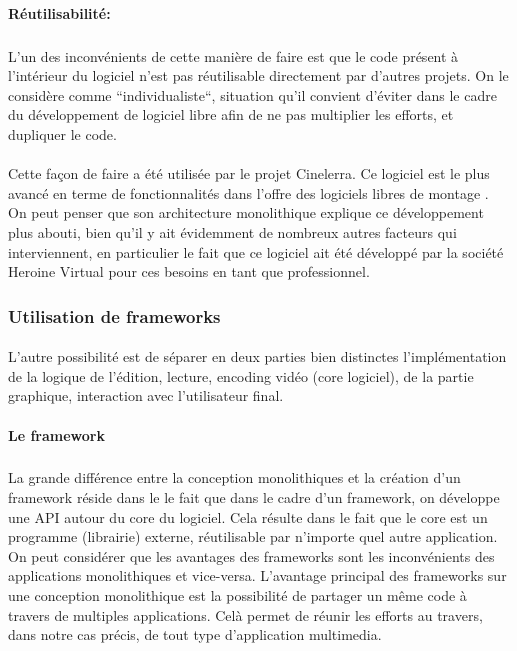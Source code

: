 \paragraph{Réutilisabilité:}

\subparagraph { }

L'un des inconvénients de cette manière de faire est que le code
présent
 à l'intérieur du logiciel n'est pas réutilisable directement
par d'autres projets. On le considère comme ``individualiste``, situation
qu'il convient d'éviter dans le cadre du développement de logiciel
libre afin de ne pas multiplier les efforts, et dupliquer le code.

\paragraph{}

Cette façon de faire a été utilisée par le projet Cinelerra. Ce
logiciel est le plus avancé en terme de fonctionnalités dans l'offre
des logiciels libres de montage . On peut penser que son architecture
monolithique explique ce développement plus
abouti, bien qu'il y ait évidemment de nombreux autres facteurs
qui interviennent, en particulier le fait que ce logiciel ait
été développé par la société Heroine Virtual pour ces besoins en tant
que professionnel.

\subsubsection {Utilisation de  frameworks }

\paragraph{}

L'autre possibilité est de séparer en deux parties bien distinctes
l'implémentation de la logique de l'édition, lecture, encoding vidéo
(core logiciel), de la partie graphique, interaction avec l'utilisateur
final.

\paragraph {Le framework}

\subparagraph{}

La grande différence entre la conception monolithiques
 et la création d'un framework 
réside dans le le fait que dans le cadre d'un framework, on développe
une API  autour du core du logiciel. Cela résulte dans le
fait que le core est un programme (librairie) externe, réutilisable par
n'importe quel autre application.  On peut considérer que les avantages
des frameworks sont les inconvénients des applications monolithiques
 et vice-versa. L'avantage principal des frameworks
sur une conception monolithique est la possibilité
de partager un même code à travers de multiples applications. Celà
permet de réunir les efforts au travers, dans notre cas précis, de
tout type d'application multimedia.

